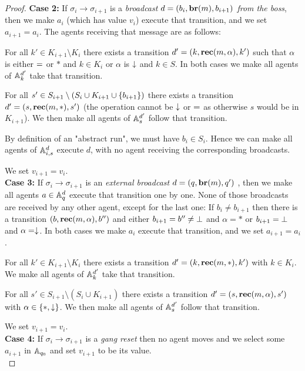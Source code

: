\begin{proof}
	\textbf{Case 2: }If $\sigma_i \to \sigma_{i+1}$ is a \emph{broadcast $d = (b_i, \textbf{br}(m), b_{i+1})$ from the boss}, then we make $a_i$ (which has value $v_i$) execute that transition, and we set $a_{i+1} = a_i$.
	The agents receiving that message are as follows:
	
	For all $k' \in K_{i+1} \setminus K_i $ there exists a transition $d'=(k, \textbf{rec}(m, \alpha), k')$ such that $\alpha$ is either ${=}$ or $*$ and $k \in K_i$ or $\alpha$ is $\downarrow$ and $k\in S$.
	In both cases we make all agents of $\mathbb{A}_k^{d'}$ take that transition.
	
	For all $s' \in S_{i+1} \setminus (S_i \cup K_{i+1} \cup \{b_{i+1}\})$ there exists a transition $d'=(s,\textbf{rec}(m, *),s')$ (the operation cannot be $\downarrow$ or ${=}$ as otherwise $s$ would be in $K_{i+1}$). We then make all agents of $\mathbb{A}_s^{d'}$ follow that transition. 
	
	By definition of an "abstract run", we must have $b_i \in S_i$.
	Hence we can make all agents of $\mathbb{A}_{i,s}^{d}$ execute $d$, with no agent receiving the corresponding broadcasts.
	
	We set $v_{i+1} = v_i$.
	\\
	
	\textbf{Case 3: } If $\sigma_i \to \sigma_{i+1}$ is an \emph{external broadcast} $d = (q, \textbf{br}(m), q')$ , then we make all agents $a \in \mathbb{A}_q^{d}$ execute that transition one by one. None of those broadcasts are received by any other agent, except for the last one:
	If $b_i \neq b_{i+1}$ then there is a transition $(b, \textbf{rec}(m, \alpha), b'')$ and either $b_{i+1} = b'' \neq \bot$ and $\alpha = *$ or $b_{i+1} = \bot$ and $\alpha=\downarrow$. In both cases we make $a_i$ execute that transition, and we set $a_{i+1} = a_i$.
	
	For all $k' \in K_{i+1} \setminus K_i$ there exists a transition $d'=(k, \textbf{rec}(m, *), k')$ with $k \in K_i$. We make all agents of $\mathbb{A}_k^{d'}$ take that transition.
	
	For all $s' \in S_{i+1} \setminus (S_i \cup K_{i+1})$ there exists a transition $d'=(s,\textbf{rec}(m, \alpha),s')$ with $\alpha \in \{*, \downarrow\}$. We then make all agents of $\mathbb{A}_s^{d'}$ follow that transition. 
	
	We set $v_{i+1} = v_i$.
	\\
	
	\textbf{Case 4: }  If $\sigma_i \to \sigma_{i+1}$ is a \emph{gang reset} then no agent moves and we select some $a_{i+1}$ in $\mathbb{A}_{q_0}$ and set $v_{i+1}$ to be its value.
	\\
	

\end{proof}
